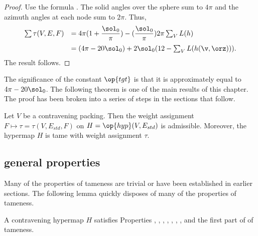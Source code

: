 \begin{proof}
Use the formula .
  The solid angles over the sphere sum to $4\pi$ and the azimuth
  angles at each node sum to $2\pi$.
Thus,
\begin{equation}\label{eqn:delta0}
\begin{array}{lll}
  \sum \tau (V,E,F) 
  &= 4\pi (1 + \dfrac{\sol_0}{\pi}) 
- (\dfrac{\sol_0}{\pi}) 2\pi \sum_{V} L(h)\vspace{6pt}\\
&= (4\pi - 20\sol_0) + 2\sol_0 (12 - \sum_V L(h(\v,\orz))).
\end{array}
\end{equation}
The result follows.
\end{proof}

The significance of the constant $\op{tgt}$ is that it is
approximately equal to $4\pi - 20\sol_0$.
%
The following theorem is one of the main results of this chapter.  The
proof has been broken into a series of steps in the sections that
follow.

\begin{theorem} \label{theorem:contravene}
  Let $V$ be a contravening packing.  Then the weight assignment
  $F\mapsto\tau=\tau(V,E_{std},F)$ on $H=\op{hyp}(V,E_{std})$ is
  admissible.  Moreover, the hypermap $H$ is tame with weight
  assignment $\tau$.
\end{theorem}
%
%
%



\subsection{general properties}
\label{sec:startame}


Many of the properties of tameness are trivial or have been
established in earlier sections.  The following lemma quickly disposes
of many of the properties of tameness.

\begin{lemma}[]\label{lemma:multi}
  A contravening hypermap $H$ satisfies Properties ,
  , , , , , , and the first
  part of 
of tameness.
\end{lemma}

